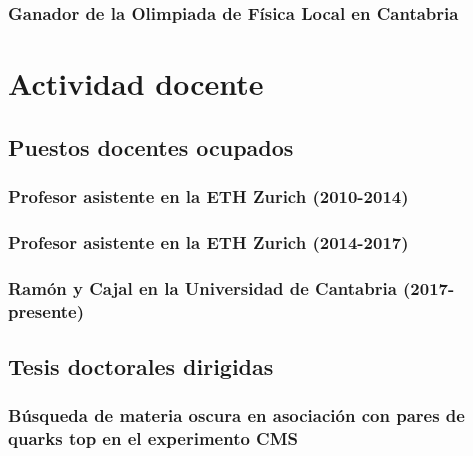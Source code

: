 \documentclass[a4paper, 11pt, twoside, openright]{report}
\begin{document}
\subsection{Ganador de la Olimpiada de Física Local en Cantabria}




\chapter{Actividad docente}

\section{Puestos docentes ocupados}
\subsection{Profesor asistente en la ETH Zurich (2010-2014)}


\subsection{Profesor asistente en la ETH Zurich (2014-2017)}


\subsection{Ramón y Cajal en la Universidad de Cantabria (2017-presente)}



\section{Tesis doctorales dirigidas}

\subsection{Búsqueda de materia oscura en asociación con pares de quarks top en el experimento CMS}

\end{document}
